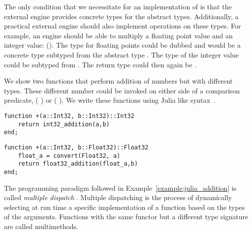 The only condition that we necessitate for an implementation of \dcproblogsty is that the external engine provides concrete types for the abstract types. Additionally, a practical external engine should also implement operations on these types. For example, an engine should be able to multiply a floating point value and an integer value: (). The type for floating points could be dubbed  and would be a concrete type subtyped from the abstract type . The type of the integer value could be  subtyped from . The return type could then again be .



\begin{example}\label{example:julia_addition}
We show two functions that perform addition of numbers but with different types. These different number could be invoked on either side of a comparison predicate, \eg ( ) or ( ). We write these functions using Julia like syntax~\citep{bezanson2017julia}. 
\begin{samepage}

\begin{verbatim}
function +(a::Int32, b::Int32)::Int32
    return int32_addition(a,b)
end;
\end{verbatim}

\end{samepage}


\begin{samepage}
\begin{verbatim}
function +(a::Int32, b::Float32)::Float32
    float_a = convert(Float32, a)
    return float32_addition(float_a,b)
end;
\end{verbatim}

\end{samepage}
\end{example}

The programming paradigm followed in Example~\ref{example:julia_addition} is called {\em multiple dispatch} \citep{keene1989object,castagna1995calculus,bezanson2017julia}.
Multiple dispatching is the process of dynamically selecting at run time a specific implementation of a function based on the types of the arguments.
Functions with the same functor but a different type signature are called multimethods.

